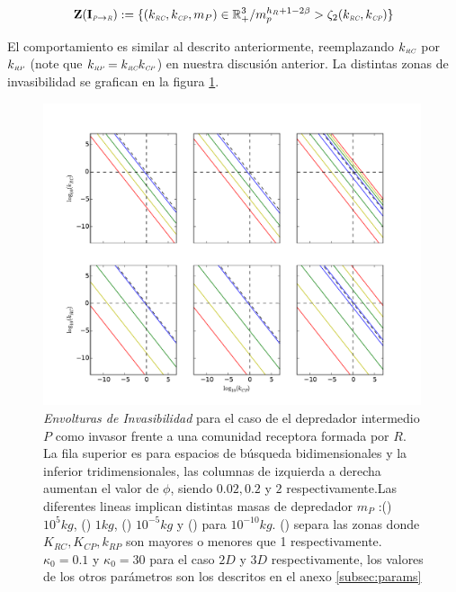 \begin{equation}
\mathbf{Z(I_{\textit{\tiny P} \to \textit{\tiny R}})} := \{ (k_{\textit{\tiny RC}},k_{\textit{\tiny CP}},m_P) \in \mathbb{R}^3_+ / m_p^{h_R + 1 - 2\beta} > \zeta_2(k_{\textit{\tiny RC}},k_{\textit{\tiny CP}}) \}
\end{equation}

El comportamiento es similar al descrito anteriormente, reemplazando $k_{\textit{\tiny RC}}$ por $k_{\textit{\tiny RP}}$ (note que $k_{\textit{\tiny RP}} = k_{\textit{\tiny RC}} k_{\textit{\tiny CP}}$) en nuestra discusi\'on anterior. La distintas zonas de invasibilidad se grafican en la figura \ref{fig:Z(IC3)}.


\begin{figure}
  \centering
  \includegraphics[width = 0.99\textwidth]{./Plots/Z(IC3)AcGrGr.pdf}
  \caption[Env $Z(IC2)$]{\emph{Envolturas de Invasibilidad} para el caso de el depredador intermedio $P$ como invasor frente a una comunidad receptora formada por $R$. La fila superior es para espacios de b\'usqueda bidimensionales y la inferior tridimensionales, las columnas de izquierda a derecha aumentan el valor de $\phi$, siendo $0.02,0.2$ y $2$ respectivamente.Las diferentes lineas implican distintas masas de depredador $m_P$ :({\hwplotR}) $10^5 kg$,  ({\hwplotY}) $1kg$, ({\hwplotG}) $10^{-5}kg$ y ({\hwplotB}) para $10^{-10}kg$. ({\hwplotK}) separa las zonas donde $K_{RC},K_{CP},k_{RP}$ son mayores o menores que 1 respectivamente. $\kappa_0 = 0.1$ y $\kappa_0 = 30$ para el caso $2D$ y $3D$ respectivamente, los valores de los otros par\'ametros son los descritos en el anexo \ref{subsec:params}}
  \label{fig:Z(IC3)}
\end{figure}

